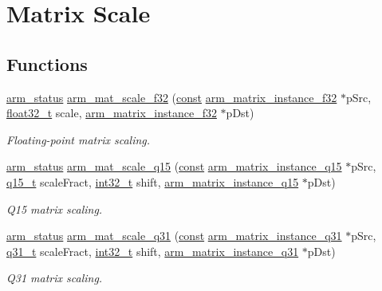 \hypertarget{group___matrix_scale}{\section{Matrix Scale}
\label{group___matrix_scale}
}
\subsection*{Functions}
\begin{DoxyCompactItemize}
\item 
\hyperlink{arm__math_8h_a5e459c6409dfcd2927bb8a57491d7cf6}{arm\-\_\-status} \hyperlink{group___matrix_scale_ga9cb4e385b18c9a0b9cbc940c1067ca12}{arm\-\_\-mat\-\_\-scale\-\_\-f32} (\hyperlink{group___n_a_m_e_ga7ae6d0e43244213b34de2c2b9aa30da6}{const} \hyperlink{structarm__matrix__instance__f32}{arm\-\_\-matrix\-\_\-instance\-\_\-f32} $\ast$p\-Src, \hyperlink{arm__math_8h_a4611b605e45ab401f02cab15c5e38715}{float32\-\_\-t} scale, \hyperlink{structarm__matrix__instance__f32}{arm\-\_\-matrix\-\_\-instance\-\_\-f32} $\ast$p\-Dst)
\begin{DoxyCompactList}\small\item\em Floating-\/point matrix scaling. \end{DoxyCompactList}\item 
\hyperlink{arm__math_8h_a5e459c6409dfcd2927bb8a57491d7cf6}{arm\-\_\-status} \hyperlink{group___matrix_scale_ga7521769e2cf1c3d9c4656138cd2ae2ca}{arm\-\_\-mat\-\_\-scale\-\_\-q15} (\hyperlink{group___n_a_m_e_ga7ae6d0e43244213b34de2c2b9aa30da6}{const} \hyperlink{structarm__matrix__instance__q15}{arm\-\_\-matrix\-\_\-instance\-\_\-q15} $\ast$p\-Src, \hyperlink{arm__math_8h_ab5a8fb21a5b3b983d5f54f31614052ea}{q15\-\_\-t} scale\-Fract, \hyperlink{group___n_a_m_e_gafd12020da5a235dfcf0c3c748fb5baed}{int32\-\_\-t} shift, \hyperlink{structarm__matrix__instance__q15}{arm\-\_\-matrix\-\_\-instance\-\_\-q15} $\ast$p\-Dst)
\begin{DoxyCompactList}\small\item\em Q15 matrix scaling. \end{DoxyCompactList}\item 
\hyperlink{arm__math_8h_a5e459c6409dfcd2927bb8a57491d7cf6}{arm\-\_\-status} \hyperlink{group___matrix_scale_ga609743821ee81fa8c34c4bcdc1ed9744}{arm\-\_\-mat\-\_\-scale\-\_\-q31} (\hyperlink{group___n_a_m_e_ga7ae6d0e43244213b34de2c2b9aa30da6}{const} \hyperlink{structarm__matrix__instance__q31}{arm\-\_\-matrix\-\_\-instance\-\_\-q31} $\ast$p\-Src, \hyperlink{arm__math_8h_adc89a3547f5324b7b3b95adec3806bc0}{q31\-\_\-t} scale\-Fract, \hyperlink{group___n_a_m_e_gafd12020da5a235dfcf0c3c748fb5baed}{int32\-\_\-t} shift, \hyperlink{structarm__matrix__instance__q31}{arm\-\_\-matrix\-\_\-instance\-\_\-q31} $\ast$p\-Dst)
\begin{DoxyCompactList}\small\item\em Q31 matrix scaling. \end{DoxyCompactList}\end{DoxyCompactItemize}


